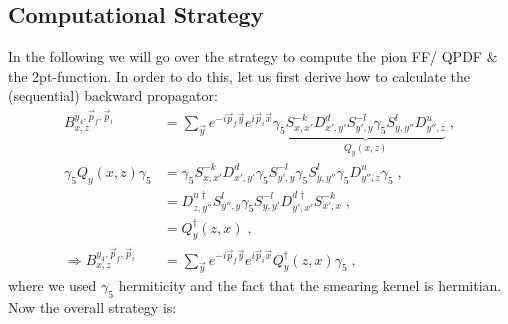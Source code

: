 \documentclass[a4paper,10pt]{scrartcl}
\begin{document}
\subsection{Computational Strategy}
In the following we will go over the strategy to compute the pion FF/ QPDF \& the 2pt-function. In order to do this, let us first derive how to calculate the (sequential) backward propagator:
\begin{align}
    B^{y_4,\vec p_f, \vec p_i}_{x,z} &= \sum_{\vec y} e^{-i \vec p_f \vec y} e^{i \vec p_i \vec x} \gamma_5 \underbrace{
    S^{-k}_{x,x'} D^d_{x',y'} S^{-l}_{y',y} 
    \gamma_5 S^l_{y,y''} D^u_{y'',z}}_{Q_y(x,z)}  \;, \\
    \gamma_5 Q_y(x,z) \gamma_5 &= \gamma_5 S^{-k}_{x,x'} D^d_{x',y'} \gamma_5 S^{-l}_{y',y} \gamma_5 S^l_{y,y''} \gamma_5 D^u_{y'',z} \gamma_5 \; ,\\
    &= D^{u \dagger}_{z,y''} S^l_{y'',y} \gamma_5 S^{-l}_{y,y'}D^{d \dagger}_{y',x'} S^{-k}_{x',x} \; , \\
    &= Q^\dagger_y(z,x) \; , \\
    \Rightarrow B^{y_4,\vec p_f, \vec p_i}_{x,z} &= \sum_{\vec y} e^{-i \vec p_f \vec y} e^{i \vec p_i \vec x} Q_y^\dagger(z,x) \gamma_5 \; ,
\end{align}
where we used $\gamma_5$ hermiticity and the fact that the smearing kernel is hermitian. Now the overall strategy is:
\end{document}
